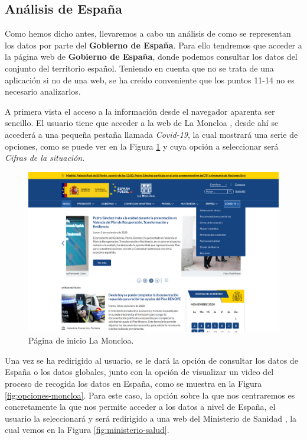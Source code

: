 \subsection{Análisis de España}

Como hemos dicho antes, llevaremos a cabo un análisis de como se representan los datos por parte del \textbf{Gobierno de España}. Para ello tendremos que acceder a la página web de \textbf{Gobierno de España}, donde podemos consultar los datos del conjunto del territorio español. Teniendo en cuenta que no se trata de una aplicación si no de una web, se ha creído conveniente que los puntos 11-14 no es necesario analizarlos.

A primera vista el acceso a la información desde el navegador aparenta ser sencillo. El usuario tiene que acceder a la web de La Moncloa \cite{la-moncloa}, desde ahí se accederá a una pequeña pestaña llamada \textit{Covid-19}, la cual mostrará una serie de opciones, como se puede ver en la Figura \ref{fig:inicio-moncloa} y cuya opción a seleccionar será \textit{Cifras de la situación}.

\begin{figure}[H]
	\centering
	\includegraphics[width=1\textwidth]{img/inicio-moncloa}
	\caption{Página de inicio La Moncloa.}
	\label{fig:inicio-moncloa}
\end{figure}

\newpage
Una vez se ha redirigido al usuario, se le dará la opción de consultar los datos de España o los datos globales, junto con la opción de visualizar un video del proceso de recogida los datos en España, como se muestra en la Figura \ref{fig:opciones-moncloa}. Para este caso, la opción sobre la que nos centraremos es concretamente la que nos permite acceder a los datos a nivel de España, el usuario la seleccionará y será redirigido a una web del Ministerio de Sanidad \cite{gob-espana}, la cual vemos en la Figura \ref{fig:ministerio-salud}.

